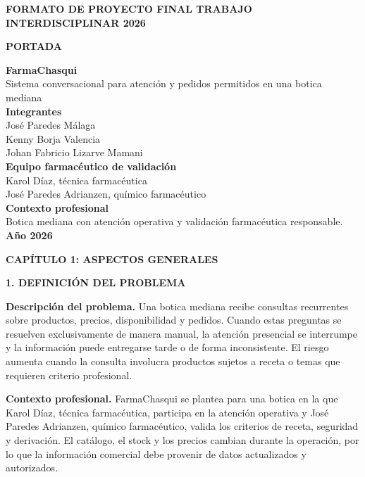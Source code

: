 \documentclass[11pt,a4paper]{article}
\newcommand{\capitulo}[1]{\vspace{1.2em}\noindent\textbf{\large #1}\par\vspace{0.45em}}
\newcommand{\apartado}[1]{\vspace{0.85em}\noindent\textbf{#1}\par\vspace{0.3em}}
\begin{document}
\begin{center}
\textbf{FORMATO DE PROYECTO FINAL TRABAJO INTERDISCIPLINAR 2026}
\end{center}

\vspace{1.8cm}
\begin{center}
\textbf{PORTADA}

\vspace{1.4cm}
{\Large\textbf{FarmaChasqui}}\\[0.45cm]
{\large Sistema conversacional para atención y pedidos permitidos en una botica mediana}\\[1.3cm]

\textbf{Integrantes}\\[0.2cm]
José Paredes Málaga\\
Kenny Borja Valencia\\
Johan Fabricio Lizarve Mamani\\[0.8cm]

\textbf{Equipo farmacéutico de validación}\\[0.2cm]
Karol Díaz, técnica farmacéutica\\
José Paredes Adrianzen, químico farmacéutico\\[0.8cm]

\textbf{Contexto profesional}\\[0.2cm]
Botica mediana con atención operativa y validación farmacéutica responsable.\\[0.8cm]

\textbf{Año 2026}
\end{center}

\newpage

\capitulo{CAPÍTULO 1: ASPECTOS GENERALES}

\apartado{1. DEFINICIÓN DEL PROBLEMA}

\textbf{Descripción del problema.} Una botica mediana recibe consultas recurrentes sobre productos, precios, disponibilidad y pedidos. Cuando estas preguntas se resuelven exclusivamente de manera manual, la atención presencial se interrumpe y la información puede entregarse tarde o de forma inconsistente. El riesgo aumenta cuando la consulta involucra productos sujetos a receta o temas que requieren criterio profesional.

\textbf{Contexto profesional.} FarmaChasqui se plantea para una botica en la que Karol Díaz, técnica farmacéutica, participa en la atención operativa y José Paredes Adrianzen, químico farmacéutico, valida los criterios de receta, seguridad y derivación. El catálogo, el stock y los precios cambian durante la operación, por lo que la información comercial debe provenir de datos actualizados y autorizados.
\end{document}
